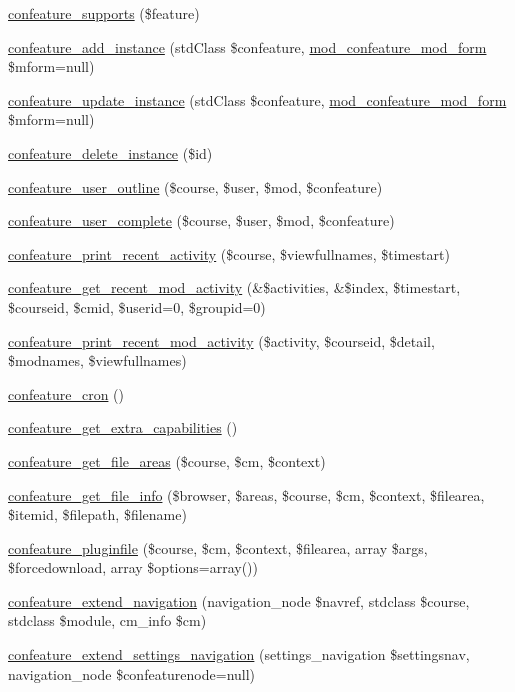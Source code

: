 \begin{DoxyCompactItemize}
\item 
\hyperlink{lib_8php_a914ec3d597da510b074e005d2fa9bfb5}{confeature\-\_\-supports} (\$feature)
\item 
\hyperlink{lib_8php_a7e22c75c28ab3ae8b48c1d332f648fc5}{confeature\-\_\-add\-\_\-instance} (std\-Class \$confeature, \hyperlink{classmod__confeature__mod__form}{mod\-\_\-confeature\-\_\-mod\-\_\-form} \$mform=null)
\item 
\hyperlink{lib_8php_a55bc12394a95bb1e3e069ce5a6e79c8f}{confeature\-\_\-update\-\_\-instance} (std\-Class \$confeature, \hyperlink{classmod__confeature__mod__form}{mod\-\_\-confeature\-\_\-mod\-\_\-form} \$mform=null)
\item 
\hyperlink{lib_8php_ae40b9e515633066eb722f342cd2588cf}{confeature\-\_\-delete\-\_\-instance} (\$id)
\item 
\hyperlink{lib_8php_a98b21d4ffd15b658a6ee2ed024d1db10}{confeature\-\_\-user\-\_\-outline} (\$course, \$user, \$mod, \$confeature)
\item 
\hyperlink{lib_8php_a0836122ac8fe9d03b33b1b7cdddcfb27}{confeature\-\_\-user\-\_\-complete} (\$course, \$user, \$mod, \$confeature)
\item 
\hyperlink{lib_8php_ab6f05e521225e88204d51134a18f79f5}{confeature\-\_\-print\-\_\-recent\-\_\-activity} (\$course, \$viewfullnames, \$timestart)
\item 
\hyperlink{lib_8php_a78a53f498e070cf78b48c225781a283d}{confeature\-\_\-get\-\_\-recent\-\_\-mod\-\_\-activity} (\&\$activities, \&\$index, \$timestart, \$courseid, \$cmid, \$userid=0, \$groupid=0)
\item 
\hyperlink{lib_8php_a664d1922079dd6d16dd38c1b84cb9075}{confeature\-\_\-print\-\_\-recent\-\_\-mod\-\_\-activity} (\$activity, \$courseid, \$detail, \$modnames, \$viewfullnames)
\item 
\hyperlink{lib_8php_aef534dc463e45aa37218730f6ee5f4e1}{confeature\-\_\-cron} ()
\item 
\hyperlink{lib_8php_aff2ab18cf7940679e6a2b29d70d5038f}{confeature\-\_\-get\-\_\-extra\-\_\-capabilities} ()
\item 
\hyperlink{lib_8php_abfb70a04d0dbc52e73316ddb4e0929a2}{confeature\-\_\-get\-\_\-file\-\_\-areas} (\$course, \$cm, \$context)
\item 
\hyperlink{lib_8php_a6a0101f98ec5eb25b09138784487faaa}{confeature\-\_\-get\-\_\-file\-\_\-info} (\$browser, \$areas, \$course, \$cm, \$context, \$filearea, \$itemid, \$filepath, \$filename)
\item 
\hyperlink{lib_8php_a1be8c984df2150d9862b762c597c0728}{confeature\-\_\-pluginfile} (\$course, \$cm, \$context, \$filearea, array \$args, \$forcedownload, array \$options=array())
\item 
\hyperlink{lib_8php_a93de60bc5ca5f3fb9d14c8b92e0dfbac}{confeature\-\_\-extend\-\_\-navigation} (navigation\-\_\-node \$navref, stdclass \$course, stdclass \$module, cm\-\_\-info \$cm)
\item 
\hyperlink{lib_8php_ad4ed71218a8e13a4d21f57b89b2290ca}{confeature\-\_\-extend\-\_\-settings\-\_\-navigation} (settings\-\_\-navigation \$settingsnav, navigation\-\_\-node \$confeaturenode=null)
\end{DoxyCompactItemize}


